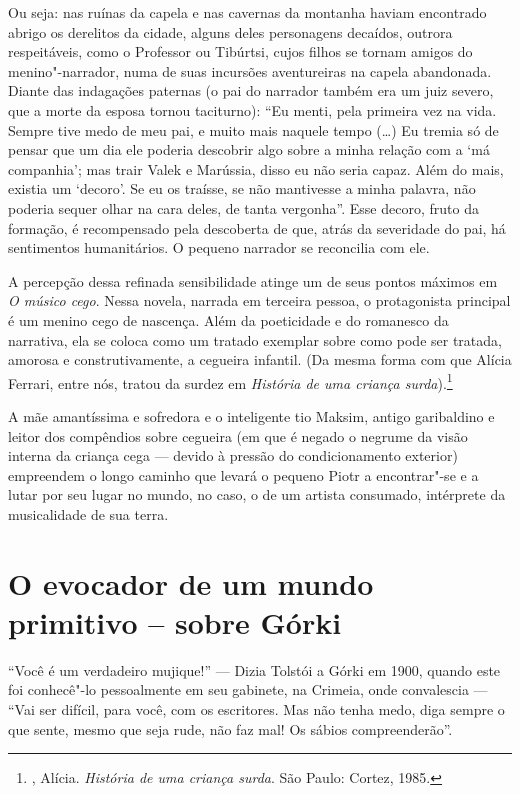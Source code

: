 {{Ou seja: nas ruínas da capela e nas cavernas da montanha haviam
encontrado abrigo os derelitos da cidade, alguns deles personagens
decaídos, outrora respeitáveis, como o Professor ou Tibúrtsi, cujos
filhos se tornam amigos do menino"-narrador, numa de suas incursões
aventureiras na capela abandonada. Diante das indagações paternas (o pai
do narrador também era um juiz severo, que a morte da esposa tornou
taciturno): ``Eu menti, pela primeira vez na vida. Sempre tive medo de
meu pai, e muito mais naquele tempo (\ldots{}) Eu tremia só de pensar que um
dia ele poderia descobrir algo sobre a minha relação com a `má
companhia'; mas trair Valek e Marússia, disso eu não seria capaz. Além
do mais, existia um `decoro'. Se eu os traísse, se não mantivesse a
minha palavra, não poderia sequer olhar na cara deles, de tanta
vergonha''. Esse decoro, fruto da formação, é recompensado pela
descoberta de que, atrás da severidade do pai, há sentimentos
humanitários. O pequeno narrador se reconcilia com ele.

A percepção dessa refinada sensibilidade atinge um de seus pontos
máximos em \emph{O músico cego}. Nessa novela, narrada em terceira
pessoa, o protagonista principal é um menino cego de nascença. Além da
poeticidade e do romanesco da narrativa, ela se coloca como um tratado
exemplar sobre como pode ser tratada, amorosa e construtivamente, a
cegueira infantil. (Da mesma forma com que Alícia Ferrari, entre nós,
tratou da surdez em \emph{História de uma criança surda}).\footnote{,
  Alícia. \emph{História de uma criança surda}. São Paulo: Cortez, 1985.}

A mãe amantíssima e sofredora e o inteligente tio Maksim, antigo
garibaldino e leitor dos compêndios sobre cegueira (em que é negado o
negrume da visão interna da criança cega --- devido à pressão do
condicionamento exterior) empreendem o longo caminho que levará o
pequeno Piotr a encontrar"-se e a lutar por seu lugar no mundo, no caso,
o de um artista consumado, intérprete da musicalidade de sua terra.

\chapter{O evocador de um mundo primitivo -- sobre Górki}

``Você é um verdadeiro mujique!'' --- Dizia Tolstói a Górki em 1900,
quando este foi conhecê"-lo pessoalmente em seu gabinete, na Crimeia, onde convalescia --- ``Vai ser
difícil, para você, com os escritores. Mas não tenha medo, diga sempre o
que sente, mesmo que seja rude, não faz mal! Os sábios compreenderão''.

}}
